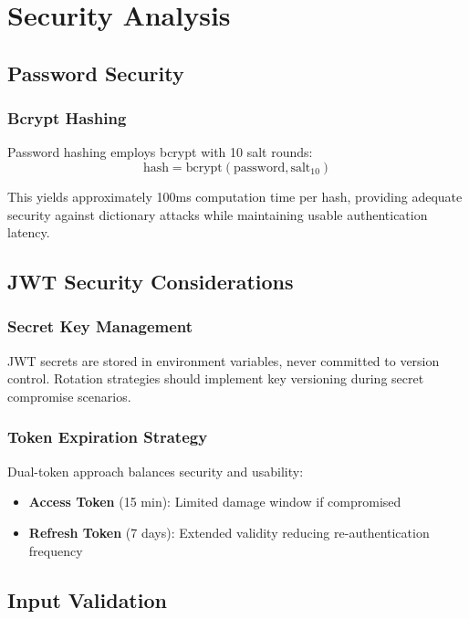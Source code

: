 \documentclass[conference]{IEEEtran}
\begin{document}
\section{Security Analysis}

\subsection{Password Security}

\subsubsection{Bcrypt Hashing}
Password hashing employs bcrypt with 10 salt rounds:
\begin{equation}
\text{hash} = \text{bcrypt}(\text{password}, \text{salt}_{10})
\end{equation}

This yields approximately 100ms computation time per hash, providing adequate security against dictionary attacks while maintaining usable authentication latency.

\subsection{JWT Security Considerations}

\subsubsection{Secret Key Management}
JWT secrets are stored in environment variables, never committed to version control. Rotation strategies should implement key versioning during secret compromise scenarios.

\subsubsection{Token Expiration Strategy}
Dual-token approach balances security and usability:
\begin{itemize}
\item \textbf{Access Token} (15 min): Limited damage window if compromised
\item \textbf{Refresh Token} (7 days): Extended validity reducing re-authentication frequency
\end{itemize}

\subsection{Input Validation}
\end{document}
